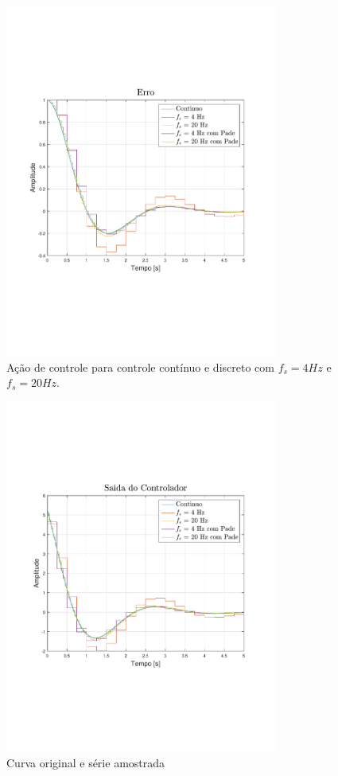     \begin{figure}[htp]
	\center
	\includegraphics[width=0.8\textwidth]{images/saidazoh.pdf}
	\caption{Ação de controle para controle contínuo e discreto com $f_s = 4 Hz$ e $f_s = 20 Hz$. }
	\label{fig:ex6controle}
    \end{figure}
    
\newpage

    \begin{figure}[H]
	\center
	\includegraphics[width=0.8\textwidth]{images/controlezoh.pdf}
	\caption{Curva original e série amostrada}
	\label{fig:ex6saida}
    \end{figure}

